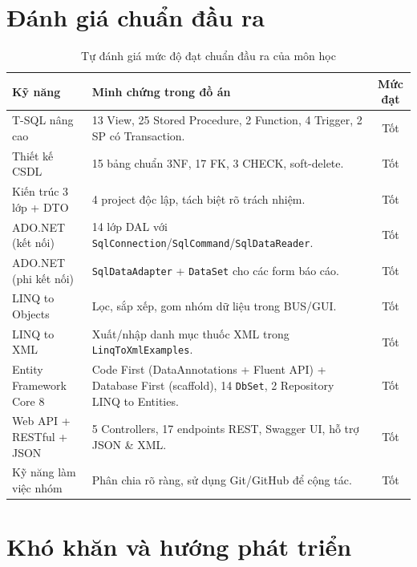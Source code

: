 \documentclass[12pt,a4paper]{report}
\begin{document}
\section{Đánh giá chuẩn đầu ra}

\begin{table}[H]
\centering
\renewcommand{\arraystretch}{1.4}
\caption{Tự đánh giá mức độ đạt chuẩn đầu ra của môn học}
\begin{tabularx}{\textwidth}{|l|X|c|}
\hline
\textbf{Kỹ năng} & \textbf{Minh chứng trong đồ án} & \textbf{Mức đạt} \\
\hline
T-SQL nâng cao & 13 View, 25 Stored Procedure, 2 Function, 4 Trigger, 2 SP có Transaction. & Tốt \\\hline
Thiết kế CSDL & 15 bảng chuẩn 3NF, 17 FK, 3 CHECK, soft-delete. & Tốt \\\hline
Kiến trúc 3 lớp + DTO & 4 project độc lập, tách biệt rõ trách nhiệm. & Tốt \\\hline
ADO.NET (kết nối) & 14 lớp DAL với \texttt{SqlConnection}/\texttt{SqlCommand}/\texttt{SqlDataReader}. & Tốt \\\hline
ADO.NET (phi kết nối) & \texttt{SqlDataAdapter} + \texttt{DataSet} cho các form báo cáo. & Tốt \\\hline
LINQ to Objects & Lọc, sắp xếp, gom nhóm dữ liệu trong BUS/GUI. & Tốt \\\hline
LINQ to XML & Xuất/nhập danh mục thuốc XML trong \texttt{LinqToXmlExamples}. & Tốt \\\hline
Entity Framework Core 8 & Code First (DataAnnotations + Fluent API) + Database First (scaffold), 14 \texttt{DbSet}, 2 Repository LINQ to Entities. & Tốt \\\hline
Web API + RESTful + JSON & 5 Controllers, 17 endpoints REST, Swagger UI, hỗ trợ JSON \& XML. & Tốt \\\hline
Kỹ năng làm việc nhóm & Phân chia rõ ràng, sử dụng Git/GitHub để cộng tác. & Tốt \\\hline
\end{tabularx}
\end{table}

\section{Khó khăn và hướng phát triển}
\end{document}
